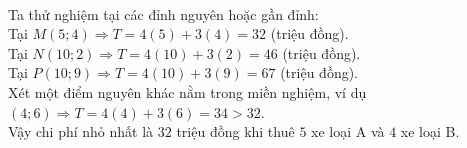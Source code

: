 \begin{ex}
{\begin{itemize}
            \\ Ta thử nghiệm tại các đỉnh nguyên hoặc gần đỉnh:
            \\ Tại $M(5; 4) \Rightarrow T = 4(5) + 3(4) = 32$ (triệu đồng).
            \\ Tại $N(10; 2) \Rightarrow T = 4(10) + 3(2) = 46$ (triệu đồng).
            \\ Tại $P(10; 9) \Rightarrow T = 4(10) + 3(9) = 67$ (triệu đồng).
            \\ Xét một điểm nguyên khác nằm trong miền nghiệm, ví dụ $(4; 6) \Rightarrow T = 4(4) + 3(6) = 34 > 32$.
            \\ Vậy chi phí nhỏ nhất là $32$ triệu đồng khi thuê $5$ xe loại A và $4$ xe loại B.
        \end{itemize}
    }
\end{ex}
